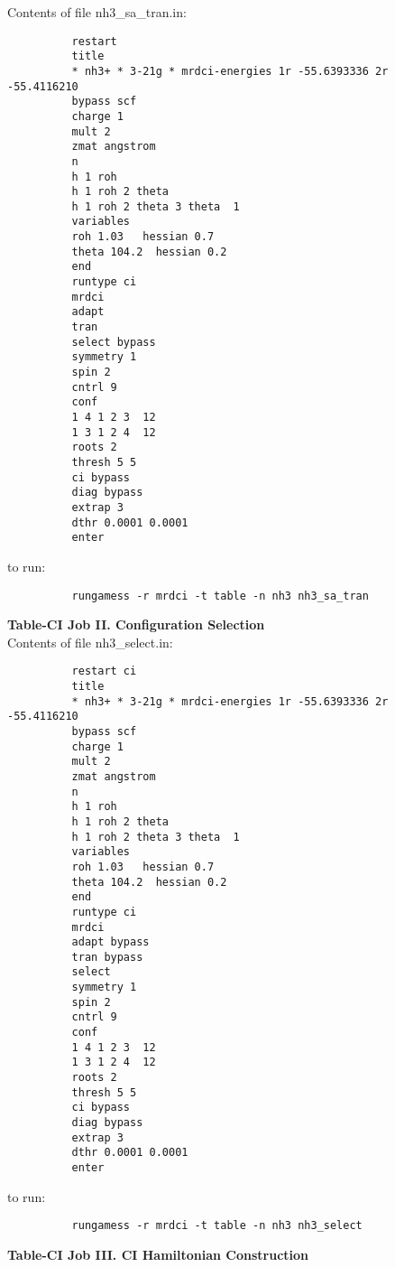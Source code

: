 \documentclass[11pt,fleqn]{article}
\begin{document}
Contents of file nh3\_sa\_tran.in:
{
\footnotesize
\begin{verbatim}
          restart
          title
          * nh3+ * 3-21g * mrdci-energies 1r -55.6393336 2r -55.4116210
          bypass scf
          charge 1
          mult 2
          zmat angstrom
          n
          h 1 roh
          h 1 roh 2 theta
          h 1 roh 2 theta 3 theta  1
          variables
          roh 1.03   hessian 0.7
          theta 104.2  hessian 0.2
          end
          runtype ci
          mrdci
          adapt 
          tran
          select bypass
          symmetry 1
          spin 2
          cntrl 9
          conf
          1 4 1 2 3  12
          1 3 1 2 4  12
          roots 2
          thresh 5 5
          ci bypass
          diag bypass
          extrap 3
          dthr 0.0001 0.0001
          enter
\end{verbatim}
}
to run:
{
\footnotesize
\begin{verbatim}
          rungamess -r mrdci -t table -n nh3 nh3_sa_tran
\end{verbatim}
}
{\bf Table-CI Job II. Configuration Selection}\\

Contents of file nh3\_select.in:
{
\footnotesize
\begin{verbatim}
          restart ci
          title
          * nh3+ * 3-21g * mrdci-energies 1r -55.6393336 2r -55.4116210
          bypass scf
          charge 1
          mult 2
          zmat angstrom
          n
          h 1 roh
          h 1 roh 2 theta
          h 1 roh 2 theta 3 theta  1
          variables
          roh 1.03   hessian 0.7
          theta 104.2  hessian 0.2
          end
          runtype ci
          mrdci
          adapt bypass
          tran bypass
          select  
          symmetry 1
          spin 2
          cntrl 9
          conf
          1 4 1 2 3  12
          1 3 1 2 4  12
          roots 2
          thresh 5 5
          ci bypass
          diag bypass
          extrap 3
          dthr 0.0001 0.0001
          enter
\end{verbatim}
}
to run:
{
\footnotesize
\begin{verbatim}
          rungamess -r mrdci -t table -n nh3 nh3_select
\end{verbatim}
}
{\bf Table-CI Job III. CI Hamiltonian Construction}\\
\end{document}
